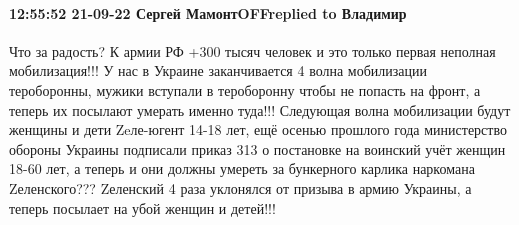  
 
 
 
 

\paragraph{12:55:52 21-09-22 Сергей МамонтOFFreplied to Владимир}

Что за радость? К армии РФ +300 тысяч человек и это только первая неполная
мобилизация!!! У нас в Украине заканчивается 4 волна мобилизации тероборонны,
мужики вступали в тероборонну чтобы не попасть на фронт, а теперь их посылают
умерать именно туда!!! Следующая волна мобилизации будут женщины и дети
Zeле-югент 14-18 лет, ещё осенью прошлого года министерство обороны Украины
подписали приказ 313 о постановке на воинский учёт женщин 18-60 лет, а теперь и
они должны умереть за бункерного карлика наркомана Zеленского??? Zеленский 4
раза уклонялся от призыва в армию Украины, а теперь посылает на убой женщин и
детей!!!

